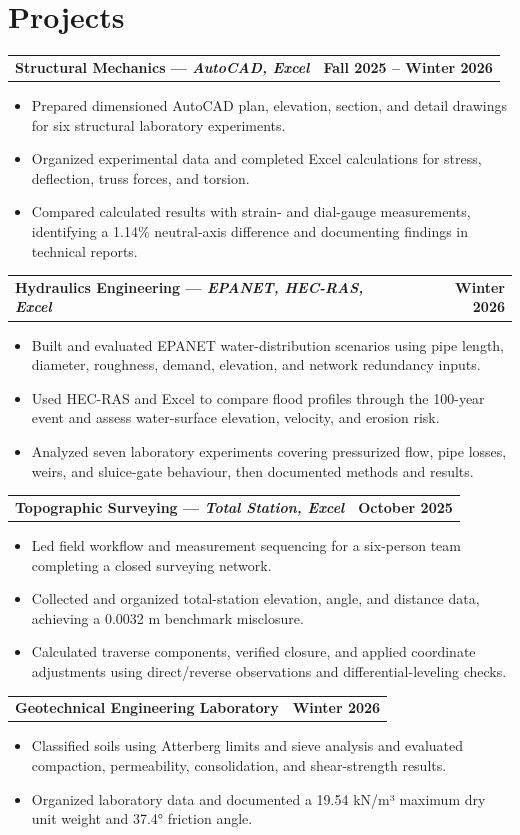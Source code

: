 \documentclass[11pt]{article}
\newcommand{\entrySingle}[2]{%
  \begin{tabularx}{\textwidth}{X r}
    \textbf{#1} & \textbf{#2}
  \end{tabularx}\vspace{-2pt}
}
\newcommand{\tightItem}[1]{\item \fontsize{10}{10.2}\selectfont #1}
\begin{document}
\section*{Projects}
\entrySingle{Structural Mechanics \;---\; \textit{AutoCAD, Excel}}{Fall 2025 -- Winter 2026}
\begin{itemize}
  \tightItem{Prepared dimensioned AutoCAD plan, elevation, section, and detail drawings for six structural laboratory experiments.}
  \tightItem{Organized experimental data and completed Excel calculations for stress, deflection, truss forces, and torsion.}
  \tightItem{Compared calculated results with strain- and dial-gauge measurements, identifying a 1.14\% neutral-axis difference and documenting findings in technical reports.}
\end{itemize}

\entrySingle{Hydraulics Engineering \;---\; \textit{EPANET, HEC-RAS, Excel}}{Winter 2026}
\begin{itemize}
  \tightItem{Built and evaluated EPANET water-distribution scenarios using pipe length, diameter, roughness, demand, elevation, and network redundancy inputs.}
  \tightItem{Used HEC-RAS and Excel to compare flood profiles through the 100-year event and assess water-surface elevation, velocity, and erosion risk.}
  \tightItem{Analyzed seven laboratory experiments covering pressurized flow, pipe losses, weirs, and sluice-gate behaviour, then documented methods and results.}
\end{itemize}

\entrySingle{Topographic Surveying \;---\; \textit{Total Station, Excel}}{October 2025}
\begin{itemize}
  \tightItem{Led field workflow and measurement sequencing for a six-person team completing a closed surveying network.}
  \tightItem{Collected and organized total-station elevation, angle, and distance data, achieving a 0.0032 m benchmark misclosure.}
  \tightItem{Calculated traverse components, verified closure, and applied coordinate adjustments using direct/reverse observations and differential-leveling checks.}
\end{itemize}

\entrySingle{Geotechnical Engineering Laboratory}{Winter 2026}
\begin{itemize}
  \tightItem{Classified soils using Atterberg limits and sieve analysis and evaluated compaction, permeability, consolidation, and shear-strength results.}
  \tightItem{Organized laboratory data and documented a 19.54 kN/m³ maximum dry unit weight and 37.4° friction angle.}
\end{itemize}
\end{document}
